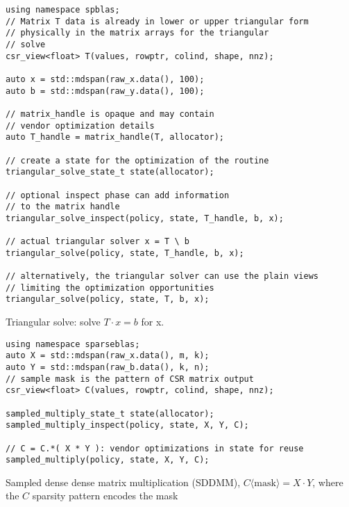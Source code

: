 \documentclass{article}
\begin{document}
\begin{listing}[H]
\begin{verbatim}
using namespace spblas;
// Matrix T data is already in lower or upper triangular form
// physically in the matrix arrays for the triangular
// solve
csr_view<float> T(values, rowptr, colind, shape, nnz);

auto x = std::mdspan(raw_x.data(), 100);
auto b = std::mdspan(raw_y.data(), 100);

// matrix_handle is opaque and may contain
// vendor optimization details
auto T_handle = matrix_handle(T, allocator);

// create a state for the optimization of the routine
triangular_solve_state_t state(allocator);

// optional inspect phase can add information
// to the matrix handle
triangular_solve_inspect(policy, state, T_handle, b, x);

// actual triangular solver x = T \ b
triangular_solve(policy, state, T_handle, b, x); 

// alternatively, the triangular solver can use the plain views
// limiting the optimization opportunities
triangular_solve(policy, state, T, b, x); 
\end{verbatim}
\caption{Triangular solve: solve $T\cdot x = b$ for x.}
\end{listing}


\begin{listing}[H]
\begin{verbatim}
using namespace sparseblas;
auto X = std::mdspan(raw_x.data(), m, k);
auto Y = std::mdspan(raw_b.data(), k, n);
// sample mask is the pattern of CSR matrix output
csr_view<float> C(values, rowptr, colind, shape, nnz);

sampled_multiply_state_t state(allocator);
sampled_multiply_inspect(policy, state, X, Y, C);

// C = C.*( X * Y ): vendor optimizations in state for reuse
sampled_multiply(policy, state, X, Y, C); 

\end{verbatim}
\caption{Sampled dense dense matrix multiplication (SDDMM), $C\langle \text{mask} \rangle = X\cdot Y$, where the $C$ sparsity pattern encodes the mask}
\end{listing}
\end{document}

